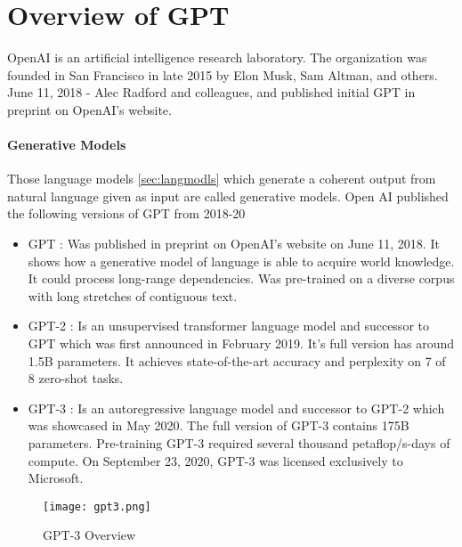 \chapter*{Overview of GPT}
\label{chap:overview}
\thispagestyle{fancy}

OpenAI is an artificial intelligence research laboratory. The organization was founded in San Francisco in late 2015 by Elon Musk, Sam Altman, and others. June 11, 2018 - Alec Radford and colleagues, and published initial GPT in preprint on OpenAI's website. 

\subsubsection*{Generative Models}
\label{subsub:genmodls}

\hspace{0.5cm} Those language models \eqref{sec:langmodls} which generate a coherent output from natural language given as input are called generative models. Open AI published the following versions of GPT from 2018-20

\begin{itemize}
    \item GPT : Was published in preprint on OpenAI's website on June 11, 2018. It shows how a generative model of language is able to acquire world knowledge. It could process long-range dependencies. Was pre-trained on a diverse corpus with long stretches of contiguous text.
    \item GPT-2 : Is an unsupervised transformer language model and successor to GPT which was first announced in February 2019. It's full version has around 1.5B parameters. It achieves state-of-the-art accuracy and perplexity on 7 of 8 zero-shot tasks.
    \item GPT-3 : Is an autoregressive language model and successor to GPT-2 which was showcased in May 2020. The full version of GPT-3 contains 175B parameters. Pre-training GPT-3 required several thousand petaflop/s-days of compute. On September 23, 2020, GPT-3 was licensed exclusively to Microsoft.
\end{itemize}

\begin{figure}[!htbp]
    \centering
    \texttt{[image: gpt3.png]}
    \caption[GPT-3 Overview]{GPT-3 Overview}
    \label{fig:gpt3ovrviw}
\end{figure}

\vspace*{\fill}